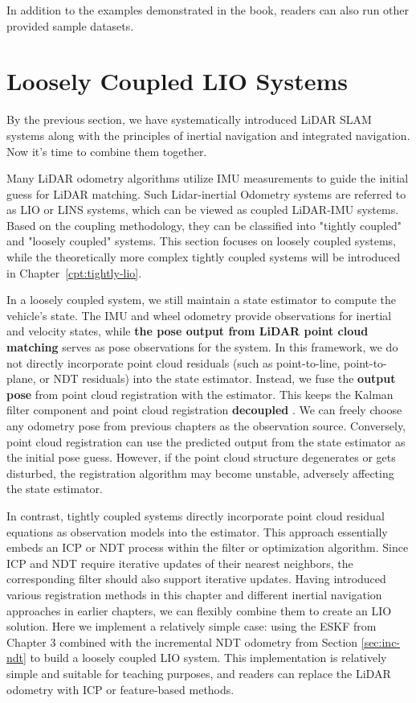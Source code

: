 In addition to the examples demonstrated in the book, readers can also run other provided sample datasets.

\section{Loosely Coupled LIO Systems}
By the previous section, we have systematically introduced LiDAR SLAM systems along with the principles of inertial navigation and integrated navigation. Now it's time to combine them together.

Many LiDAR odometry algorithms utilize IMU measurements to guide the initial guess for LiDAR matching. Such Lidar-inertial Odometry systems are referred to as LIO or LINS systems, which can be viewed as coupled LiDAR-IMU systems. Based on the coupling methodology, they can be classified into "tightly coupled" and "loosely coupled" systems. This section focuses on loosely coupled systems, while the theoretically more complex tightly coupled systems will be introduced in Chapter~\ref{cpt:tightly-lio}.

In a loosely coupled system, we still maintain a state estimator to compute the vehicle's state. The IMU and wheel odometry provide observations for inertial and velocity states, while \textbf{the pose output from LiDAR point cloud matching} serves as pose observations for the system. In this framework, we do not directly incorporate point cloud residuals (such as point-to-line, point-to-plane, or NDT residuals) into the state estimator. Instead, we fuse the \textbf{output pose} from point cloud registration with the estimator. This keeps the Kalman filter component and point cloud registration \textbf{decoupled} \cite{Tang2015}. We can freely choose any odometry pose from previous chapters as the observation source. Conversely, point cloud registration can use the predicted output from the state estimator as the initial pose guess. However, if the point cloud structure degenerates or gets disturbed, the registration algorithm may become unstable, adversely affecting the state estimator.

In contrast, tightly coupled systems directly incorporate point cloud residual equations as observation models into the estimator. This approach essentially embeds an ICP or NDT process within the filter or optimization algorithm. Since ICP and NDT require iterative updates of their nearest neighbors, the corresponding filter should also support iterative updates. Having introduced various registration methods in this chapter and different inertial navigation approaches in earlier chapters, we can flexibly combine them to create an LIO solution. Here we implement a relatively simple case: using the ESKF from Chapter 3 combined with the incremental NDT odometry from Section \ref{sec:inc-ndt} to build a loosely coupled LIO system. This implementation is relatively simple and suitable for teaching purposes, and readers can replace the LiDAR odometry with ICP or feature-based methods.

